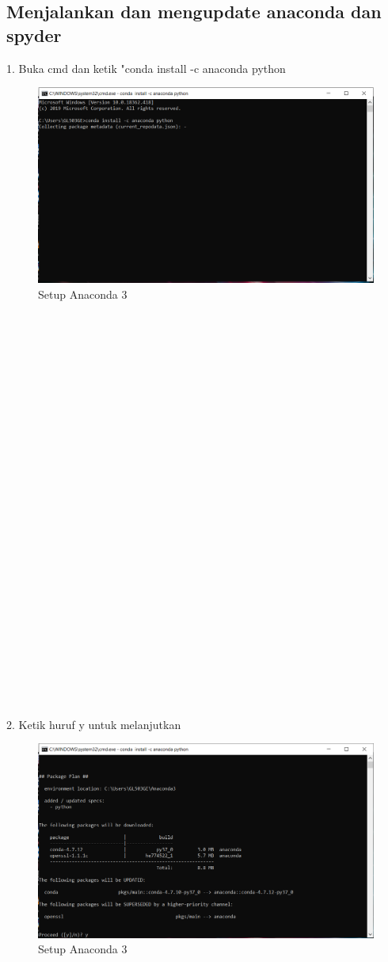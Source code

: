 \documentclass{article}
\begin{document}
\subsection{Menjalankan dan mengupdate anaconda dan spyder}
1. Buka cmd dan ketik "conda install -c anaconda python
\begin{figure}[h]
	\centering
		\includegraphics[scale=0.5]{Gambar/D1.PNG}
		\caption{Setup Anaconda 3}
\end{figure}
\\
\\
\\
\\
\\
\\
\\
\\
\\
\\
\\
\\
\\
\\
\\
\\
\\
\\
\\
\\
\\
\\
\\
\\
\\
\\
2. Ketik huruf y untuk melanjutkan
\begin{figure}[h]
	\centering
		\includegraphics[scale=0.5]{Gambar/D2.PNG}
		\caption{Setup Anaconda 3}
\end{figure}
\end{document}
